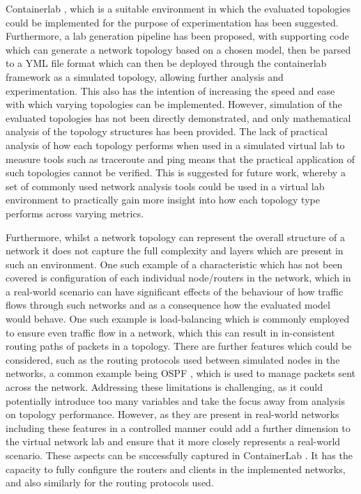 Containerlab \cite{containerlab}, which is a suitable environment in which the evaluated topologies could be implemented for the purpose of experimentation has been suggested. Furthermore, a lab generation pipeline has been proposed, with supporting code which can generate a network topology based on a chosen model, then be parsed to a YML file format which can then be deployed through the containerlab \cite{containerlab} framework as a simulated topology, allowing further analysis and experimentation. This also has the intention of increasing the speed and ease with which varying topologies can be implemented.  However, simulation of the evaluated topologies has not been directly demonstrated, and only mathematical analysis of the topology structures has been provided. The lack of practical analysis of how each topology performs when used in a simulated virtual lab to measure tools such as traceroute and ping means that the practical application of such topologies cannot be verified. This is suggested for future work, whereby a set of commonly used network analysis tools could be used in a virtual lab environment to practically gain more insight into how each topology type performs across varying metrics. 

Furthermore, whilst a network topology can represent the overall structure of a network it does not capture the full complexity and layers which are present in such an environment. One such example of a characteristic which has not been covered is configuration of each individual node/routers in the network, which in a real-world scenario can have significant effects of the behaviour of how traffic flows through such networks and as a consequence how the evaluated model would behave. One such example is load-balancing which is commonly employed to ensure even traffic flow in a network, which this can result in in-consistent routing paths of packets in a topology. There are further features which could be considered, such as the routing protocols used between simulated nodes in the networks, a common example being OSPF \cite{OSPF_new}, which is used to manage packets sent across the network. Addressing these limitations is challenging, as it could potentially introduce too many variables and take the focus away from analysis on topology performance. However, as they are present in real-world networks including these features in a controlled manner could add a further dimension to the virtual network lab and ensure that it more closely represents a real-world scenario. These aspects can be successfully captured in ContainerLab \cite{containerlab} . It has the capacity to fully configure the routers and clients in the implemented networks, and also similarly for the routing protocols used. 

